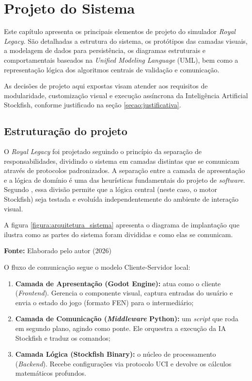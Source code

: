 \chapter{Projeto do Sistema}
\label{capitulo:projeto}

Este capítulo apresenta os principais elementos de projeto do simulador \textit{Royal Legacy}. São detalhadas a estrutura do sistema, os protótipos das camadas visuais, a modelagem de dados para persistência, os diagramas estruturais e comportamentais baseados na \textit{Unified Modeling Language} (UML), bem como a representação lógica dos algoritmos centrais de validação e comunicação.

As decisões de projeto aqui expostas visam atender aos requisitos de modularidade, customização visual e execução assíncrona da Inteligência Artificial Stockfish, conforme justificado na seção \ref{secao:justificativa}.

\section{Estruturação do projeto}

O \textit{Royal Legacy} foi projetado seguindo o princípio da separação de responsabilidades, dividindo o sistema em camadas distintas que se comunicam através de protocolos padronizados. A separação entre a camada de apresentação e a lógica de domínio é uma das heurísticas fundamentais do projeto de \textit{software}. Segundo , essa divisão permite que a lógica central (neste caso, o motor Stockfish) seja testada e evoluída independentemente do ambiente de interação visual. 

A figura \ref{figura:arquitetura_sistema} apresenta o diagrama de implantação que ilustra como as partes do sistema foram divididas e como elas se comunicam.

\begin{center}
	\vspace{-0.2cm} %
	\small \textbf{Fonte:} Elaborado pelo autor (2026)
\end{center}

O fluxo de comunicação segue o modelo Cliente-Servidor local:
\begin{enumerate}
	\item \textbf{Camada de Apresentação (Godot Engine):} atua como o cliente (\textit{Frontend}). Gerencia o componente visual, captura entradas do usuário e envia o estado do jogo (formato FEN) para o intermediário;
	\item \textbf{Camada de Comunicação (\textit{Middleware} Python):} um \textit{script} que roda em segundo plano, agindo como ponte. Ele orquestra a execução da IA Stockfish e traduz os comandos;
	\item \textbf{Camada Lógica (Stockfish Binary):} o núcleo de processamento (\textit{Backend}). Recebe configurações via protocolo UCI e devolve os cálculos matemáticos profundos.
\end{enumerate}

